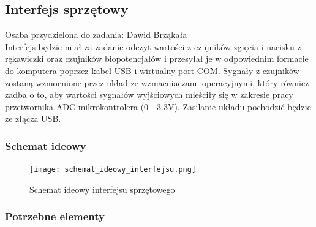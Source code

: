 \documentclass{article}
\begin{document}
\subsection{Interfejs sprzętowy}
Osaba przydzielona do zadania: Dawid Brząkała \\
Interfejs będzie miał za zadanie odczyt wartości z czujników zgięcia i nacisku z rękawiczki oraz czujników biopotencjałów i przesyłał je w odpowiednim formacie do komputera poprzez kabel USB i wirtualny port COM. Sygnały z czujników zostaną wzmocnione przez układ ze wzmacniaczami operacyjnymi, który również zadba o to, aby wartości sygnałów wyjściowych mieściły się w zakresie pracy przetwornika ADC mikrokontrolera (0 - 3.3V). Zasilanie układu pochodzić będzie ze złącza USB.
\subsubsection{Schemat ideowy}
\begin{figure}[ht!]
\centering
\texttt{[image: schemat\_ideowy\_interfejsu.png]}
\label{fig:interfejs}
\caption {Schemat ideowy interfejsu sprzętowego}

\end{figure}


\subsubsection{Potrzebne elementy}
\end{document}
